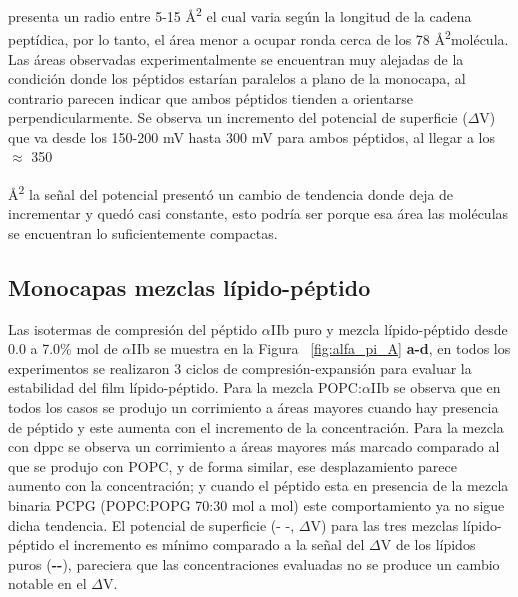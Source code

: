 presenta un radio entre 5-15 Å\textsuperscript{2} el cual varia según la longitud de la cadena peptídica, por lo tanto, el área menor a ocupar ronda cerca de los 78 Å\textsuperscript{2}molécula.  Las áreas observadas experimentalmente se encuentran muy alejadas de la condición donde los péptidos estarían paralelos a plano de la monocapa, al contrario parecen indicar que ambos péptidos tienden a orientarse perpendicularmente. Se observa un incremento del potencial de superficie ($\Delta$V)  que va desde los 150-200 mV hasta 300 mV para ambos péptidos, al llegar a los $\approx$ 350 {Å\textsuperscript{2} la señal del potencial presentó un cambio de tendencia donde deja de incrementar y quedó casi constante, esto podría ser porque esa área las moléculas se encuentran lo suficientemente compactas.


\subsection{Monocapas mezclas lípido-péptido}

Las isotermas de compresión del péptido $\alpha$IIb puro y mezcla lípido-péptido desde 0.0 a 7.0\% mol de $\alpha$IIb  se muestra en la Figura ~\ref{fig:alfa_pi_A} \textbf{a-d}, en todos los experimentos se realizaron 3 ciclos de compresión-expansión para evaluar la estabilidad del film lípido-péptido. Para la mezcla \ac{POPC}:$\alpha$IIb se observa que en todos los casos se produjo un corrimiento a áreas mayores cuando hay presencia de péptido y este aumenta con el incremento de la concentración. Para la mezcla con \ac{dppc} se observa un corrimiento a áreas mayores más marcado comparado al que se produjo con \ac{POPC}, y de forma similar, ese desplazamiento parece aumento con la concentración; y cuando el péptido esta en presencia de la mezcla binaria PCPG (POPC:POPG 70:30 mol a mol) este comportamiento ya no sigue dicha tendencia.
El potencial de superficie (- -, $\Delta$V) para las tres mezclas lípido-péptido el incremento es mínimo comparado a la señal del $\Delta$V de los lípidos puros (\textbf{\Large{-\large{\faTimes}-}}), pareciera que las concentraciones evaluadas no se produce un cambio notable en el $\Delta$V.


}

